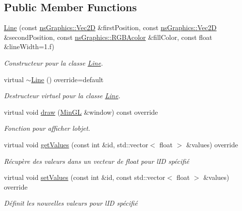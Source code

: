 \subsection*{Public Member Functions}
\begin{DoxyCompactItemize}
\item 
\hyperlink{classns_shape_1_1_line_a7e565c06c16396c7dba0f9d9beedcd17}{Line} (const \hyperlink{classns_graphics_1_1_vec2_d}{ns\+Graphics\+::\+Vec2D} \&first\+Position, const \hyperlink{classns_graphics_1_1_vec2_d}{ns\+Graphics\+::\+Vec2D} \&second\+Position, const \hyperlink{classns_graphics_1_1_r_g_b_acolor}{ns\+Graphics\+::\+R\+G\+B\+Acolor} \&fill\+Color, const float \&line\+Width=1.f)
\begin{DoxyCompactList}\small\item\em Constructeur pour la classe \hyperlink{classns_shape_1_1_line}{Line}. \end{DoxyCompactList}\item 
virtual \hyperlink{classns_shape_1_1_line_a5e867a9bf0795b3a89cffb0c84e21b13}{$\sim$\+Line} () override=default
\begin{DoxyCompactList}\small\item\em Destructeur virtuel pour la classe \hyperlink{classns_shape_1_1_line}{Line}. \end{DoxyCompactList}\item 
virtual void \hyperlink{classns_shape_1_1_line_ae14d0de306fa91ee38bafd1d27682beb}{draw} (\hyperlink{class_min_g_l}{Min\+GL} \&window) const override
\begin{DoxyCompactList}\small\item\em Fonction pour afficher l\textquotesingle{}objet. \end{DoxyCompactList}\item 
virtual void \hyperlink{classns_shape_1_1_line_a572149171c74fb9453c3e2f4093ec466}{get\+Values} (const int \&id, std\+::vector$<$ float $>$ \&values) override
\begin{DoxyCompactList}\small\item\em Récupère des valeurs dans un vecteur de float pour l\textquotesingle{}ID spécifié \end{DoxyCompactList}\item 
virtual void \hyperlink{classns_shape_1_1_line_a9984a9a1e69256065de1bd0cc51d2e8f}{set\+Values} (const int \&id, const std\+::vector$<$ float $>$ \&values) override
\begin{DoxyCompactList}\small\item\em Définit les nouvelles valeurs pour l\textquotesingle{}ID spécifié \end{DoxyCompactList}\item 

\end{DoxyCompactItemize}

